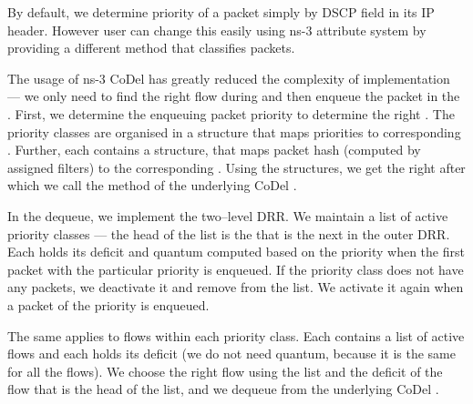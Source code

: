 By default, we determine priority of a packet simply by DSCP field in its IP header. However user can change this easily using ns-3 attribute system by providing a different method that classifies packets. 

The usage of ns-3 CoDel has greatly reduced the complexity of implementation --- we only need  to find the right flow during  and then enqueue the packet in the . First, we determine the enqueuing packet priority to determine the right . The priority classes are organised in a structure that maps priorities to corresponding . Further, each  contains a structure, that maps packet hash (computed by assigned filters) to the corresponding . Using the structures, we get the right  after which we call the  method of the underlying CoDel .

In the dequeue, we implement the two--level DRR. We maintain a list of active priority classes --- the head of the list is the  that is the next in the outer DRR. Each  holds its deficit and quantum computed based on the priority when the first packet with the particular priority is enqueued. If the priority class does not have any packets, we deactivate it and remove from the list. We activate it again when a packet of the priority is enqueued.

The same applies to flows within each priority class. Each  contains a list of active flows and each  holds its deficit (we do not need quantum, because it is the same for all the flows). We choose the right flow using the list and the deficit of the flow that is the head of the list, and we dequeue from the underlying CoDel .   












